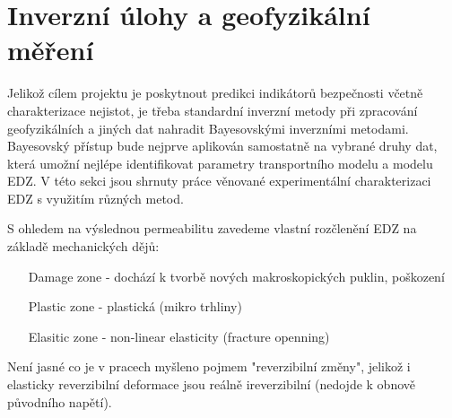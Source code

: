 \documentclass{article}
\begin{document}
% 
% 
% 
% 
% 
% 
% 
% 


\section{Inverzní úlohy a geofyzikální měření}
\label{sec:inverse_problems}

Jelikož cílem projektu je poskytnout predikci indikátorů bezpečnosti 
včetně charakterizace nejistot, je třeba standardní inverzní metody při zpracování geofyzikálních a jiných dat nahradit Bayesovskými inverzními metodami. Bayesovský přístup bude nejprve aplikován samostatně na vybrané druhy dat, která umožní nejlépe identifikovat parametry transportního modelu a modelu EDZ. V této sekci jsou shrnuty práce věnované experimentální charakterizaci EDZ s využitím různých metod.

S ohledem na výslednou permeabilitu zavedeme vlastní rozčlenění EDZ na základě mechanických dějů:
\begin{itemize}
    \item [Damage zone] - dochází k tvorbě nových makroskopických puklin, poškození
    \item [Plastic zone] - plastická (mikro trhliny)
    \item [Elasitic zone] - non-linear elasticity (fracture openning)
\end{itemize}
Není jasné co je v pracech myšleno pojmem "reverzibilní změny", jelikož i elasticky reverzibilní deformace jsou reálně ireverzibilní (nedojde k obnově původního napětí).
\end{document}
